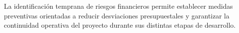 \documentclass[12pt,oneside,letterpaper]{book}
\begin{document}
\vspace{0.3cm}

La identificación temprana de riesgos financieros permite establecer medidas preventivas orientadas a reducir desviaciones presupuestales y garantizar la continuidad operativa del proyecto durante sus distintas etapas de desarrollo.

\end{document}
